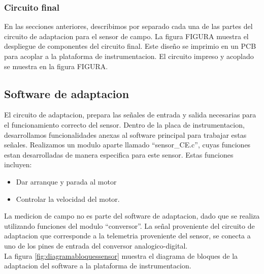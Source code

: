 
\subsubsection{Circuito final} %
\label{it6:ssub:circuito_final}

En las secciones anteriores, describimos por separado cada una de las partes del circuito de adaptacion para el sensor de campo. La figura FIGURA muestra el despliegue de componentes del circuito final. Este diseño se imprimio en un PCB para acoplar a la plataforma de instrumentacion. El circuito impreso y acoplado se muestra en la figura FIGURA.





\subsection{Software de adaptacion} %
\label{it6:sec:software_de_adaptacion}


El circuito de adaptacion, prepara las señales de entrada y salida necesarias para el funcionamiento correcto del sensor. Dentro de la placa de instrumentacion, desarrollamos funcionalidades anexas al software principal para trabajar estas señales.
Realizamos un modulo aparte llamado ``sensor_CE.c'', cuyas funciones estan desarrolladas de manera especifica para este sensor. Estas funciones incluyen:

\begin{itemize}
	\item Dar arranque y parada al motor
	\item Controlar la velocidad del motor.
\end{itemize}

La medicion de campo no es parte del software de adaptacion, dado que se realiza utilizando funciones del modulo ``conversor''. La señal proveniente del circuito de adaptacion que corresponde a la telemetria proveniente del sensor, se conecta a uno de los pines de entrada del conversor analogico-digital. \\

La figura \ref{fig:diagramabloquessensor} muestra el diagrama de bloques de la adaptacion del software a la plataforma de instrumentacion.

